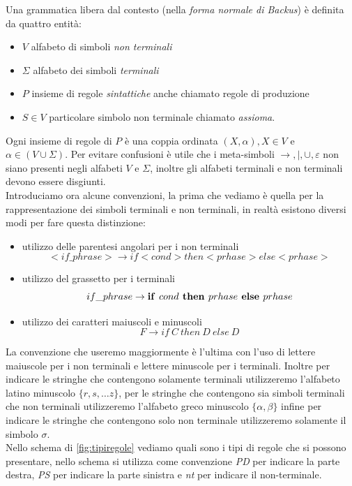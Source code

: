 Una grammatica libera dal contesto (nella \emph{forma normale di Backus}) è definita da quattro entità:
\begin{itemize}
\item $ V $ alfabeto di simboli \emph{non terminali}
\item $ \Sigma $ alfabeto dei simboli \emph{terminali}
\item $ P $ insieme di regole \emph{sintattiche} anche chiamato regole di produzione
\item  $ S \in V $ particolare simbolo non terminale chiamato \emph{assioma}.
\end{itemize}
Ogni insieme di regole di $ P $ è una coppia ordinata $ (X,\alpha), X \in V $ e $ \alpha\in(V\cup\Sigma) $. Per evitare confusioni è utile che i meta-simboli $ \rightarrow, | , \cup, \varepsilon $ non siano presenti negli alfabeti $ V $ e $ \Sigma $, inoltre gli alfabeti terminali e non terminali devono essere disgiunti.\\
Introduciamo ora alcune convenzioni, la prima che vediamo è quella per la rappresentazione dei simboli terminali e non terminali, in realtà esistono diversi modi per fare questa distinzione:
\begin{itemize}
	\item utilizzo delle parentesi angolari per i non terminali
	$$<if\_phrase> \rightarrow if <cond> then <prhase> else <prhase>$$
	\item utilizzo del grassetto per i terminali
	$$if\_phrase \rightarrow \text{\textbf{if }} cond \text{\textbf{ then }} prhase \text{\textbf{ else }} prhase$$
	\item utilizzo dei caratteri maiuscoli e minuscoli
	$$ F \rightarrow if \ C \ then \ D \ else \ D $$
\end{itemize}
La convenzione che useremo maggiormente è l'ultima con l'uso di lettere maiuscole per i non terminali e lettere minuscole per i terminali. Inoltre per indicare le stringhe che contengono solamente terminali utilizzeremo l'alfabeto latino minuscolo $ \{r,s,\dots z\} $, per le stringhe che contengono sia simboli terminali che non terminali utilizzeremo l'alfabeto greco minuscolo $ \{\alpha,\beta \} $ infine per indicare le stringhe che contengono solo non terminale utilizzeremo solamente il simbolo $ \sigma $.\\
Nello schema di \figurename\ref{fig:tipiregole} vediamo quali sono i tipi di regole che si possono presentare, nello schema si utilizza come convenzione \emph{PD} per indicare la parte destra, \emph{PS} per indicare la parte sinistra e \emph{nt} per indicare il non-terminale.
